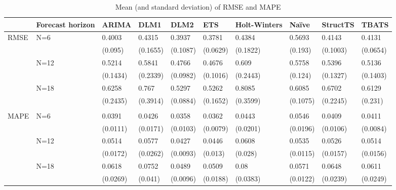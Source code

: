 \documentclass[12pt, a4paper]{article}
\begin{document}
\begin{table}[H]

\caption{\label{tab:error-comparison}Mean (and standard deviation) of RMSE and MAPE}
\centering
\small
\begin{tabular}{p{0.9cm}p{1.0cm}p{1.2cm}p{1.2cm}p{1.2cm}p{1.2cm}p{1.2cm}p{1.2cm}p{1.2cm}p{1.2cm}}
\toprule
 & Forecast horizon & ARIMA & DLM1 & DLM2 & ETS & Holt-Winters & Naïve & StructTS & TBATS\\
\midrule
RMSE & N=6 & 0.4003 & 0.4315 & 0.3937 & 0.3781 & 0.4384 & 0.5693 & 0.4143 & 0.4131\\
 &  & (0.095) & (0.1655) & (0.1087) & (0.0629) & (0.1822) & (0.193) & (0.1003) & (0.0654)\\
 & N=12 & 0.5214 & 0.5841 & 0.4766 & 0.4676 & 0.609 & 0.5758 & 0.5396 & 0.5136\\
 &  & (0.1434) & (0.2339) & (0.0982) & (0.1016) & (0.2443) & (0.124) & (0.1327) & (0.1403)\\
 & N=18 & 0.6258 & 0.767 & 0.5297 & 0.5262 & 0.8085 & 0.6085 & 0.6702 & 0.6129\\
 &  & (0.2435) & (0.3914) & (0.0884) & (0.1652) & (0.3599) & (0.1075) & (0.2245) & (0.231)\\
 &  &  &  &  &  &  &  &  & \\
MAPE & N=6 & 0.0391 & 0.0426 & 0.0358 & 0.0362 & 0.0443 & 0.0546 & 0.0409 & 0.0411\\
 &  & (0.0111) & (0.0171) & (0.0103) & (0.0079) & (0.0201) & (0.0196) & (0.0106) & (0.0084)\\
 & N=12 & 0.0514 & 0.0577 & 0.0427 & 0.0446 & 0.0608 & 0.0535 & 0.0526 & 0.0514\\
 &  & (0.0172) & (0.0262) & (0.0093) & (0.013) & (0.028) & (0.0115) & (0.0157) & (0.0156)\\
 & N=18 & 0.0618 & 0.0752 & 0.0489 & 0.0509 & 0.08 & 0.0571 & 0.0648 & 0.0611\\
 &  & (0.0269) & (0.041) & (0.0096) & (0.0188) & (0.0383) & (0.0122) & (0.0239) & (0.0249)\\
\bottomrule
\end{tabular}
\end{table}
\end{document}
